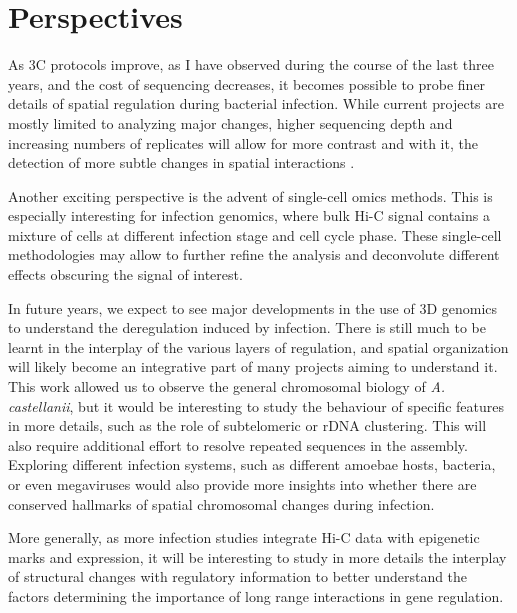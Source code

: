 
\chapter{Perspectives} %

\label{ch:03-03} %

As 3C protocols improve, as I have observed during the course of the last three years, and the cost of sequencing decreases, it becomes possible to probe finer details of spatial regulation during bacterial infection. While current projects are mostly limited to analyzing major changes, higher sequencing depth and increasing numbers of replicates will allow for more contrast and with it, the detection of more subtle changes in spatial interactions \cite{mullerCharacterizingMeioticChromosomes2018}.

Another exciting perspective is the advent of single-cell omics methods. This is especially interesting for infection genomics, where bulk Hi-C signal contains a mixture of cells at different infection stage and cell cycle phase. These single-cell methodologies may allow to further refine the analysis and deconvolute different effects obscuring the signal of interest.

In future years, we expect to see major developments in the use of 3D genomics to understand the deregulation induced by infection. There is still much to be learnt in the interplay of the various layers of regulation, and spatial organization will likely become an integrative part of many projects aiming to understand it. This work allowed us to observe the general chromosomal biology of \textit{A. castellanii}, but it would be interesting to study the behaviour of specific features in more details, such as the role of subtelomeric or rDNA clustering. This will also require additional effort to resolve repeated sequences in the assembly. Exploring different infection systems, such as different amoebae hosts, bacteria, or even megaviruses would also provide more insights into whether there are conserved hallmarks of spatial chromosomal changes during infection.

More generally, as more infection studies integrate Hi-C data with epigenetic marks and expression, it will be interesting to study in more details the interplay of structural changes with regulatory information to better understand the factors determining the importance of long range interactions in gene regulation.

